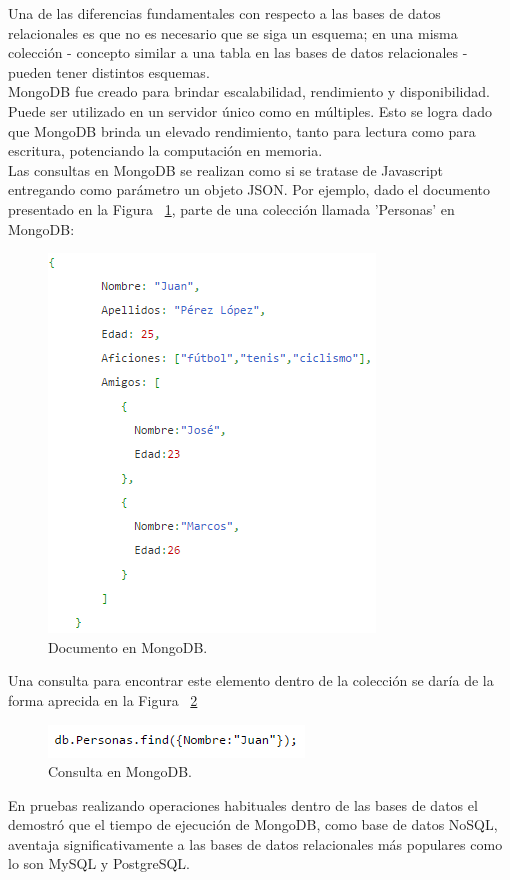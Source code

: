 	Una de las diferencias fundamentales con respecto a las bases de datos relacionales es que no es necesario que se siga un esquema; en una misma colección - concepto similar a una tabla en las bases de datos relacionales - pueden tener distintos esquemas.\\

	MongoDB fue creado para brindar escalabilidad, rendimiento y disponibilidad. Puede ser utilizado en un servidor único como en múltiples. Esto se logra dado que MongoDB brinda un elevado rendimiento, tanto para lectura como para escritura, potenciando la computación en memoria.\\

	Las consultas en MongoDB se realizan como si se tratase de Javascript entregando como parámetro un objeto JSON. Por ejemplo, dado el documento presentado en la Figura ~\ref{fig:MongoJsonExample}, parte de una colección llamada 'Personas' en MongoDB:

	\begin{figure}[!ht]
		\centering
		\captionsetup{justification=centering}
		\includegraphics[scale=0.8]{images/MongoJsonExample.png}
		\caption[Documento en MongoDB.]{Documento en MongoDB.}
		\label{fig:MongoJsonExample}
	\end{figure}


	Una consulta para encontrar este elemento dentro de la colección se daría de la forma aprecida en la Figura ~\ref{fig:MongoJsonQueryExample}\\

	

	\begin{figure}[!ht]
		\centering
		\captionsetup{justification=centering}
		\includegraphics[scale=0.8]{images/MongoJsonQueryExample.png}
		\caption[Consulta en MongoDB.]{Consulta en MongoDB.}
		\label{fig:MongoJsonQueryExample}
	\end{figure}


	En pruebas realizando operaciones habituales dentro de las bases de datos el \cite{mongoPerformance} demostró que el tiempo de ejecución de MongoDB, como base de datos NoSQL, aventaja significativamente a las bases de datos relacionales más populares como lo son MySQL y PostgreSQL.


	